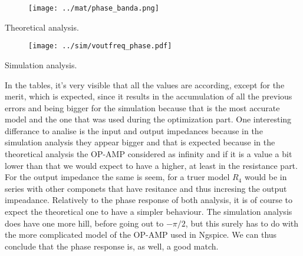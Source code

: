 \begin{table}[H]
    \begin{minipage}{.5\textwidth}
    \centering
    \begin{figure}[H]
    \centering
    \texttt{[image: ../mat/phase\_banda.png]}
    \end{figure}
    \caption{Theoretical analysis.}
    \end{minipage}
    \begin{minipage}{.5\textwidth}
    \begin{figure}[H]
    \centering
    \texttt{[image: ../sim/voutfreq\_phase.pdf]}
    \end{figure}
    \caption{Simulation analysis.} 
    \end{minipage}
\end{table}

In the tables, it's very visible that all the values are according, except for the merit, which is expected, since it results in the accumulation of all the previous errors and being bigger for the simulation because that is the most accurate model and the one that was used during the optimization part. One interesting differance to analise is the input and output impedances because in the simulation analysis they appear bigger and that is expected because in the theoretical analysis the OP-AMP considered as infinity and if it is a value a bit lower than that we would expect to have a higher, at least in the resistance part. For the output impedance the same is seem, for a truer model $R_{4}$ would be in series with other componets that have resitance and thus incresing the output impeadance. Relatively to the phase response of both analysis, it is of course to expect the theoretical one to have a simpler behaviour. The simulation analysis does have one more hill, before going out to $-\pi/2$, but this surely has to do with the more complicated model of the OP-AMP used in Ngspice. We can thus conclude that the phase response is, as well, a good match.